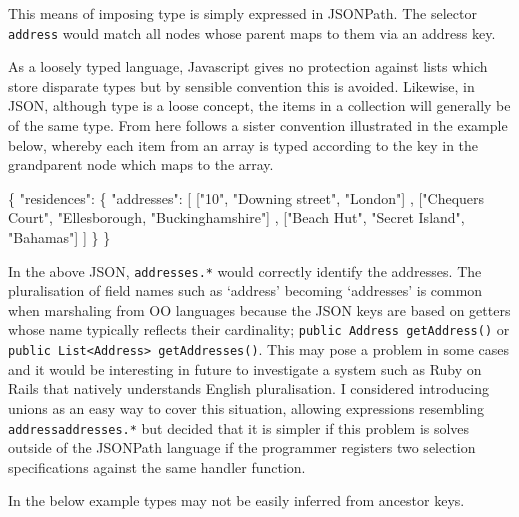 \documentclass[]{article}
\newenvironment{Shaded}{}{}
\newcommand{\StringTok}[1]{\textcolor[rgb]{0.25,0.44,0.63}{{#1}}}
\newcommand{\NormalTok}[1]{{#1}}
\begin{document}
This means of imposing type is simply expressed in JSONPath. The
selector \texttt{address} would match all nodes whose parent maps to
them via an address key.

As a loosely typed language, Javascript gives no protection against
lists which store disparate types but by sensible convention this is
avoided. Likewise, in JSON, although type is a loose concept, the items
in a collection will generally be of the same type. From here follows a
sister convention illustrated in the example below, whereby each item
from an array is typed according to the key in the grandparent node
which maps to the array.

\begin{Shaded}
\begin{Highlighting}[]
\NormalTok{\{}
   \StringTok{"residences"}\NormalTok{: \{}
      \StringTok{"addresses"}\NormalTok{: [}
         \NormalTok{[}\StringTok{"10"}\NormalTok{, }\StringTok{"Downing street"}\NormalTok{, }\StringTok{"London"}\NormalTok{]}
      \NormalTok{,  [}\StringTok{"Chequers Court"}\NormalTok{, }\StringTok{"Ellesborough, "}\NormalTok{Buckinghamshire}\StringTok{"]      }
      \NormalTok{,  [}\StringTok{"Beach Hut"}\NormalTok{, }\StringTok{"Secret Island"}\NormalTok{, }\StringTok{"Bahamas"}\NormalTok{]}
      \NormalTok{]}
   \NormalTok{\}}
\NormalTok{\}}
\end{Highlighting}
\end{Shaded}

In the above JSON, \texttt{addresses.*} would correctly identify the
addresses. The pluralisation of field names such as `address' becoming
`addresses' is common when marshaling from OO languages because the JSON
keys are based on getters whose name typically reflects their
cardinality; \texttt{public Address getAddress()} or
\texttt{public List\textless{}Address\textgreater{} getAddresses()}.
This may pose a problem in some cases and it would be interesting in
future to investigate a system such as Ruby on Rails that natively
understands English pluralisation. I considered introducing unions as an
easy way to cover this situation, allowing expressions resembling
\texttt{address\textbar{}addresses.*} but decided that it is simpler if
this problem is solves outside of the JSONPath language if the
programmer registers two selection specifications against the same
handler function.

In the below example types may not be easily inferred from ancestor
keys.
\end{document}
